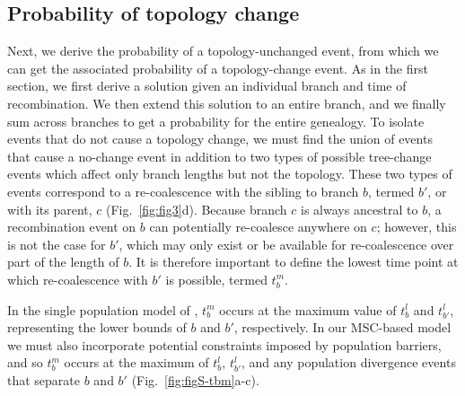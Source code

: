 \documentclass[11pt]{article}
\begin{document}
\subsection{Probability of topology change}
Next, we derive the probability of a topology-unchanged event, from which
we can get the associated probability of a topology-change event. 
As in the first section, we first derive a solution given an individual 
branch and time of recombination. We then extend this solution to an entire branch, and we 
finally sum across branches to get a probability for the entire genealogy. 
To isolate events that do not cause a topology change, we must find
the union of events that cause a no-change event in addition to two types of 
possible tree-change events which affect only branch lengths but not the 
topology. These two types of events correspond to a re-coalescence with the 
sibling to branch $b$, termed $b'$, or with its parent, $c$ (Fig.~\ref{fig:fig3}d).
Because branch $c$ is always ancestral to $b$, a recombination
event on $b$ can potentially re-coalesce anywhere on $c$; however, 
this is not the case for $b'$, which may only exist or be available for 
re-coalescence over part of the length of $b$. It is therefore important 
to define the lowest time point at which re-coalescence with $b'$ is 
possible, termed $t_b^m$. 

In the single population model of \citet{deng_distribution_2021}, 
$t_b^m$ occurs at the maximum value of $t_b^l$ and $t_{b'}^l$, 
representing the lower bounds of $b$ and $b'$, respectively. 
In our MSC-based model we must also incorporate potential 
constraints imposed by population barriers, and so $t_b^m$ occurs at 
the maximum of $t_b^l$, $t_{b'}^l$, and any population divergence 
events that separate $b$ and $b'$ (Fig.~\ref{fig:figS-tbm}a-c).



\end{document}
